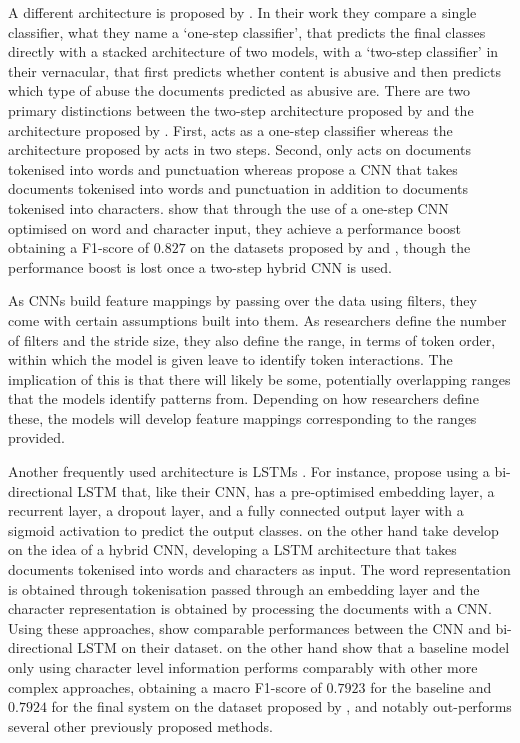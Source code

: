 A different architecture is proposed by \citet{Park:2017}.
In their work they compare a single classifier, what they name a `one-step classifier', that predicts the final classes directly with a stacked architecture of two models, with a `two-step classifier' in their vernacular, that first predicts whether content is abusive and then predicts which type of abuse the documents predicted as abusive are.
There are two primary distinctions between the two-step architecture proposed by \citet{Park:2017} and the architecture proposed by \citet{Kolhatkar:2020}.
First, \citet{Kolhatkar:2020} acts as a one-step classifier whereas the architecture proposed by \citet{Park:2017} acts in two steps.
Second, \citet{Kolhatkar:2020} only acts on documents tokenised into words and punctuation whereas \citet{Park:2017} propose a CNN that takes documents tokenised into words and punctuation in addition to documents tokenised into characters.
\citet{Park:2017} show that through the use of a one-step CNN optimised on word and character input, they achieve a performance boost obtaining a F1-score of $0.827$ on the datasets proposed by \citet{Waseem-Hovy:2016} and \citet{Waseem:2016}, though the performance boost is lost once a two-step hybrid CNN is used.

As CNNs build feature mappings by passing over the data using filters, they come with certain assumptions built into them.
As researchers define the number of filters and the stride size, they also define the range, in terms of token order, within which the model is given leave to identify token interactions.
The implication of this is that there will likely be some, potentially overlapping ranges that the models identify patterns from.
Depending on how researchers define these, the models will develop feature mappings corresponding to the ranges provided.

Another frequently used architecture is LSTMs \citep{Badjatiya:2017,Kolhatkar:2020,Meyer:2019}.
For instance, \citet{Kolhatkar:2020} propose using a bi-directional LSTM that, like their CNN, has a pre-optimised embedding layer, a recurrent layer, a dropout layer, and a fully connected output layer with a sigmoid activation to predict the output classes.
\citet{Meyer:2019} on the other hand take develop on the idea of a hybrid CNN, developing a LSTM architecture that takes documents tokenised into words and characters as input.
The word representation is obtained through tokenisation passed through an embedding layer and the character representation is obtained by processing the documents with a CNN.
Using these approaches, \citet{Kolhatkar:2020} show comparable performances between the CNN and bi-directional LSTM on their dataset.
\citet{Meyer:2019} on the other hand show that a baseline model only using character level information performs comparably with other more complex approaches, obtaining a macro F1-score of $0.7923$ for the baseline and $0.7924$ for the final system on the dataset proposed by \citet{Waseem-Hovy:2016}, and notably out-performs several other previously proposed methods.

